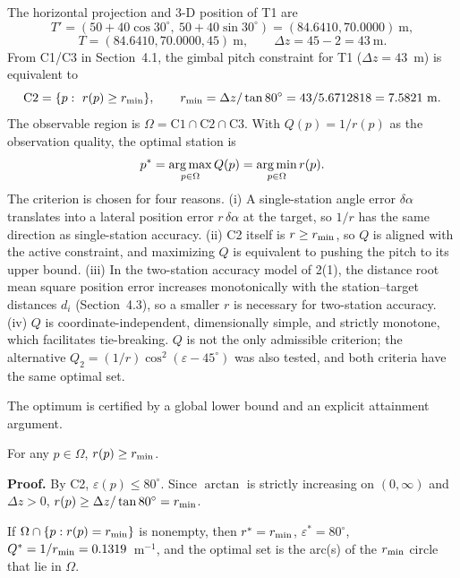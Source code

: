 The horizontal projection and 3-D position of T1 are
\begin{equation}
  T'=(50+40\cos30^\circ,\ 50+40\sin30^\circ)=(84.6410,70.0000)~\mathrm{m},
\end{equation}
\begin{equation}
  T=(84.6410,70.0000,45)~\mathrm{m},\qquad \Delta z=45-2=43~\mathrm{m}.
\end{equation}
From C1/C3 in Section~4.1, the gimbal pitch constraint for T1 ($\Delta z=43$~m) is equivalent to
\begin{equation}
  \mathrm{C2}=\{p:\ r(p)\ge\rmin\},\qquad \rmin=\Delta z/\tan80^\circ=43/5.6712818=7.5821~\mathrm{m}.
\end{equation}
The observable region is $\Omega=\mathrm{C1}\cap\mathrm{C2}\cap\mathrm{C3}$. With $Q(p)=1/r(p)$ as the observation quality, the optimal station is
\begin{equation}
  p^*=\operatorname*{arg\,max}_{p\in\Omega}Q(p)=\operatorname*{arg\,min}_{p\in\Omega}r(p).
\end{equation}
The criterion is chosen for four reasons. (i) A single-station angle error $\delta\alpha$ translates into a lateral position error $r\,\delta\alpha$ at the target, so $1/r$ has the same direction as single-station accuracy. (ii) C2 itself is $r\ge r_{\min}$, so $Q$ is aligned with the active constraint, and maximizing $Q$ is equivalent to pushing the pitch to its upper bound. (iii) In the two-station accuracy model of 2(1), the distance root mean square position error increases monotonically with the station--target distances $d_i$ (Section~4.3), so a smaller $r$ is necessary for two-station accuracy. (iv) $Q$ is coordinate-independent, dimensionally simple, and strictly monotone, which facilitates tie-breaking. $Q$ is not the only admissible criterion; the alternative $Q_2=(1/r)\cos^2(\varepsilon-45^\circ)$ was also tested, and both criteria have the same optimal set.

The optimum is certified by a global lower bound and an explicit attainment argument.

\begin{lemma}
For any $p\in\Omega$, $r(p)\ge r_{\min}$.
\end{lemma}

\noindent\textbf{Proof.} By C2, $\varepsilon(p)\le80^\circ$. Since $\arctan$ is strictly increasing on $(0,\infty)$ and $\Delta z>0$, $r(p)\ge\Delta z/\tan80^\circ=r_{\min}$.

\begin{theorem}
If $\Omega\cap\{p:r(p)=r_{\min}\}$ is nonempty, then $r^*=r_{\min}$, $\varepsilon^*=80^\circ$, $Q^*=1/r_{\min}=0.1319$~m$^{-1}$, and the optimal set is the arc(s) of the $r_{\min}$ circle that lie in $\Omega$.
\end{theorem}

